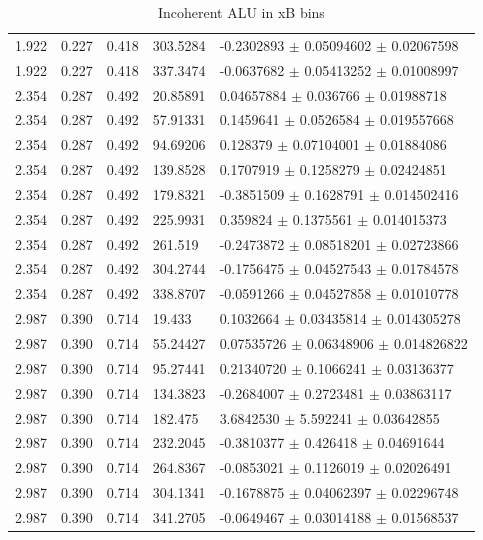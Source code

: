\begin{table}[!h]
\begin{center}
\begin{tabular}{||l|l|l|l|l||}
  1.922 & 0.227 & 0.418 &   303.5284  &  -0.2302893   $\pm$  0.05094602   $\pm$  0.02067598     \\
  1.922 & 0.227 & 0.418 &   337.3474  &  -0.0637682   $\pm$  0.05413252   $\pm$  0.01008997     \\
  \hline                                                                       
  2.354 & 0.287 & 0.492 &   20.85891  &  0.04657884   $\pm$  0.036766     $\pm$  0.01988718     \\
  2.354 & 0.287 & 0.492 &   57.91331  &  0.1459641    $\pm$  0.0526584    $\pm$  0.019557668    \\
  2.354 & 0.287 & 0.492 &   94.69206  &  0.128379     $\pm$  0.07104001   $\pm$  0.01884086     \\
  2.354 & 0.287 & 0.492 &   139.8528  &  0.1707919    $\pm$  0.1258279    $\pm$  0.02424851     \\
  2.354 & 0.287 & 0.492 &   179.8321  &  -0.3851509   $\pm$  0.1628791    $\pm$  0.014502416    \\
  2.354 & 0.287 & 0.492 &   225.9931  &  0.359824     $\pm$  0.1375561    $\pm$  0.014015373    \\
  2.354 & 0.287 & 0.492 &   261.519   &  -0.2473872   $\pm$  0.08518201   $\pm$  0.02723866     \\
  2.354 & 0.287 & 0.492 &   304.2744  &  -0.1756475   $\pm$  0.04527543   $\pm$  0.01784578     \\
  2.354 & 0.287 & 0.492 &   338.8707  &  -0.0591266   $\pm$  0.04527858   $\pm$  0.01010778     \\
 \hline                                                                        
  2.987 & 0.390 & 0.714 &   19.433    &  0.1032664    $\pm$  0.03435814   $\pm$  0.014305278    \\
  2.987 & 0.390 & 0.714 &   55.24427  &  0.07535726   $\pm$  0.06348906   $\pm$  0.014826822    \\
  2.987 & 0.390 & 0.714 &   95.27441  &  0.21340720   $\pm$  0.1066241    $\pm$  0.03136377     \\
  2.987 & 0.390 & 0.714 &   134.3823  &  -0.2684007   $\pm$  0.2723481    $\pm$  0.03863117     \\
  2.987 & 0.390 & 0.714 &   182.475   &  3.6842530    $\pm$  5.592241     $\pm$  0.03642855     \\
  2.987 & 0.390 & 0.714 &   232.2045  &  -0.3810377   $\pm$  0.426418     $\pm$  0.04691644     \\
  2.987 & 0.390 & 0.714 &   264.8367  &  -0.0853021   $\pm$  0.1126019    $\pm$  0.02026491     \\
  2.987 & 0.390 & 0.714 &   304.1341  &  -0.1678875   $\pm$  0.04062397   $\pm$  0.02296748     \\
  2.987 & 0.390 & 0.714 &   341.2705  &  -0.0649467   $\pm$  0.03014188   $\pm$  0.01568537     \\
 \hline
 \hline
 \end{tabular}
 \caption{Incoherent ALU in xB bins}
 \label{table:InCoh_xB_BSA}
 \end{center}
\end{table}



